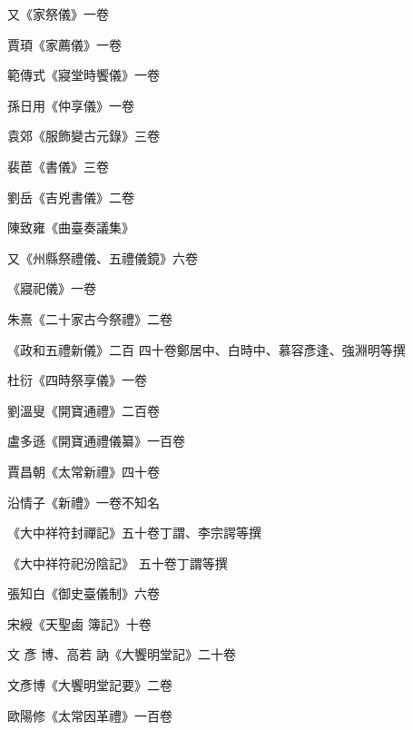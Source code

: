 \begin{pinyinscope}
 又《家祭儀》一卷



 賈頊《家薦儀》一卷



 範傳式《寢堂時饗儀》一卷



 孫日用《仲享儀》一卷



 袁郊《服飾變古元錄》三卷



 裴茞《書儀》三卷



 劉岳《吉兇書儀》二卷



 陳致雍《曲臺奏議集》



 又《州縣祭禮儀、五禮儀鏡》六卷



 《寢祀儀》一卷



 朱熹《二十家古今祭禮》二卷



 《政和五禮新儀》二百
 四十卷鄭居中、白時中、慕容彥逢、強淵明等撰



 杜衍《四時祭享儀》一卷



 劉溫叟《開寶通禮》二百卷



 盧多遜《開寶通禮儀纂》一百卷



 賈昌朝《太常新禮》四十卷



 沿情子《新禮》一卷不知名



 《大中祥符封禪記》五十卷丁謂、李宗諤等撰



 《大中祥符祀汾陰記》
 五十卷丁謂等撰



 張知白《御史臺儀制》六卷



 宋綬《天聖鹵
 簿記》十卷



 文
 彥
 博、高若
 訥《大饗明堂記》二十卷



 文彥博《大饗明堂記要》二卷



 歐陽修《太常因革禮》一百卷




\end{pinyinscope}
